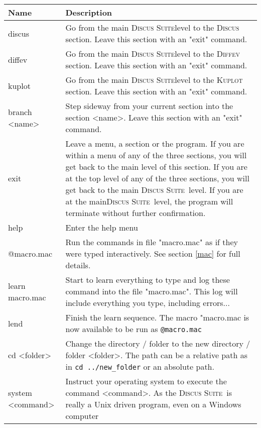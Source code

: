 \documentclass[11pt]{report}
\newcommand{\Discus}{\textsc{Discus\ }}
\newcommand{\Diffev}{\textsc{Diffev\ }}
\newcommand{\Kuplot}{\textsc{Kuplot\ }}
\newcommand{\Suite}{\textsc{Discus Suite\ }}
\newcommand{\suite}{\textsc{Discus Suite}}
\begin{document}
{\begin{table}[!tbh]
\centering
\begin{tabularx}{\textwidth}{|p{50mm}|X|}
  \hline
  {\bf Name} &  {\bf Description} \\
  \hline\hline
  discus & Go from the main \suite level to the \Discus
           section.
           Leave this section with an "exit" command. \\
  \hline
  diffev & Go from the main \suite level to the \Diffev
           section.
           Leave this section with an "exit" command. \\
  \hline
  kuplot & Go from the main \suite level to the \Kuplot
           section. 
           Leave this section with an "exit" command. \\
  \hline
  branch <name> & Step sideway from your current section into 
           the section <name>. 
           Leave this section with an "exit" command. \\
  \hline
  exit & Leave a menu, a section or the program. If you are 
         within a menu of any of the three sections, you will
         get back to the main level of this section. If you are
         at the top level of any of the three sections, you 
         will get back to the main \Suite level. If you are at
         the main\Suite level, the program will terminate 
         without further confirmation. \\
  \hline
   help & Enter the help menu\\
  \hline
   @macro.mac & Run the commands in file "macro.mac" as if 
          they were typed interactively. See section \ref{mac}
          for full details.\\
  \hline
   learn macro.mac & Start to learn everything to type and
          log these command into the file "macro.mac". 
          This log will include everything you type, including 
          errors...\\
  \hline
   lend & Finish the learn sequence. The macro "macro.mac is 
          now available to be run as {\tt @macro.mac}\\
  \hline
   cd <folder> & Change the directory / folder to the new 
          directory / folder <folder>. 
          The path can be a 
          relative path as in {\tt cd ../new\_folder} or
          an absolute path.\\
  \hline
   system <command> & Instruct your operating system to execute
          the command <command>. As the \Suite is really a
          Unix driven program, even on a Windows computer

\end{tabularx}
\end{table}}
\end{document}
